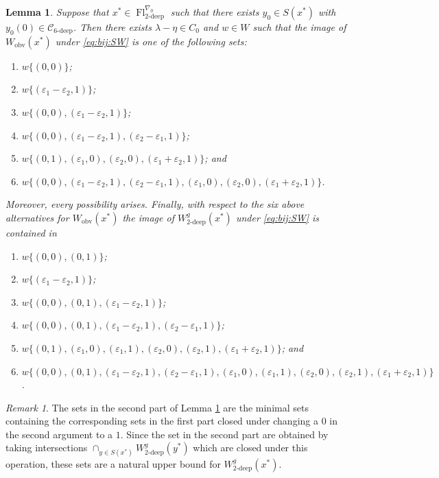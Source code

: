 \documentclass[oneside,a4paper,english, 11pt]{amsart}
\theoremstyle{plain}
\theoremstyle{plain}
\theoremstyle{plain}
\newtheorem{lemma}[thm]{Lemma}
\theoremstyle{plain}
\theoremstyle{plain}
\theoremstyle{plain}
\theoremstyle{definition}
\theoremstyle{definition}
\theoremstyle{definition}
\theoremstyle{remark}
\newtheorem{rmk}[thm]{Remark}
\numberwithin{equation}{section}
\newcommand{\cC}{\mathcal{C}}
\newcommand{\eps}{\varepsilon}
\DeclareMathOperator{\Fl}{Fl}
\begin{document}
\begin{lemma}\label{lemma:obvwts}
%
Suppose that $x^* \in \Fl_{2\textrm{-deep}}^{\nabla_0}$ such that there exists $y_0\in S(x^*)$ with $y_0(0) \in \cC_{6\textrm{-deep}}$. Then there exists $\lambda-\eta \in  C_0$ and $w\in W$ such that the image of $W_{\mathrm{obv}}(x^*)$ under \eqref{eq:bij:SW} is one of the following sets: 
\begin{enumerate}
\item
\label{case1} 
$w\{(0,0)\}$;
\item
\label{case2} 
$w\{(\eps_1-\eps_2,1)\}$;
\item
\label{case3} 
$w\{(0,0),(\eps_1-\eps_2,1)\}$;
\item 
\label{case4}
$w\{(0,0),(\eps_1-\eps_2,1), (\eps_2-\eps_1,1)\}$;
\item 
\label{case5}
$w\{(0,1),(\eps_1,0), (\eps_2,0), (\eps_1+\eps_2,1)\}$; and
\item 
\label{case6}
$w\{(0,0),(\eps_1-\eps_2,1), (\eps_2-\eps_1,1), (\eps_1,0),(\eps_2,0),(\eps_1+\eps_2,1)\}$.
\end{enumerate}
%
Moreover, every possibility arises.
Finally, with respect to the six above alternatives for $W_{\mathrm{obv}}(x^*)$ the image of $W^g_{2\textrm{-deep}}(x^*)$ under \eqref{eq:bij:SW} is contained in 
\begin{enumerate}[label=(\arabic*$'$)]
\item 
\label{case1'}
$w\{(0,0),(0,1)\}$;
\item 
\label{case2'}
$w\{(\eps_1-\eps_2,1)\}$;
\item 
\label{case3'}
$w\{(0,0),(0,1),(\eps_1-\eps_2,1)\}$;
\item 
\label{case4'}
$w\{(0,0),(0,1),(\eps_1-\eps_2,1), (\eps_2-\eps_1,1)\}$;
\item 
\label{case5'}
$w\{(0,1),(\eps_1,0),(\eps_1,1), (\eps_2,0),(\eps_2,1), (\eps_1+\eps_2,1)\}$; and
\item 
\label{case6'}
$w\{(0,0),(0,1),(\eps_1-\eps_2,1), (\eps_2-\eps_1,1), (\eps_1,0),(\eps_1,1),(\eps_2,0),(\eps_2,1),(\eps_1+\eps_2,1)\}$.
\end{enumerate}
\end{lemma}
\begin{rmk}
The sets in the second part of Lemma \ref{lemma:obvwts} are the minimal sets containing the corresponding sets in the first part closed under changing a $0$ in the second argument to a $1$. 
Since the set in the second part are obtained by taking intersections $\cap_{y\in S(x^*)} W^g_{2\textrm{-deep}}(y^*)$ which are closed under this operation, these sets are a natural upper bound for $W^g_{2\textrm{-deep}}(x^*)$. 
\end{rmk}
\end{document}
